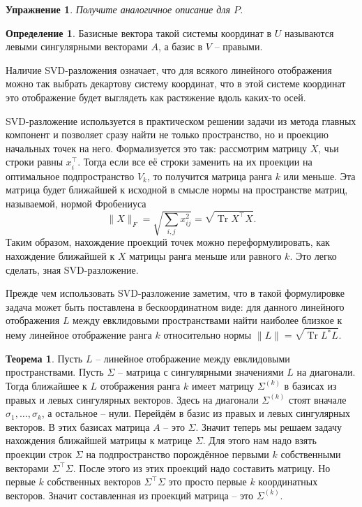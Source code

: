 \documentclass[10pt,a4paper,oneside]{book}
\newtheorem{uprz}{\color{violet!100!black} Упражнение}
\theoremstyle{definition}
\newtheorem*{defn}{\color{yellow!30!red} Определение}
\newtheorem{thm}{\color{red!40!black}Теорема}
\newcommand{\Tr}{\operatorname{Tr}}
\def\thrm{\begin{thm}}
\def\ethrm{\end{thm}}
\def\dfn{\begin{defn}}
\def\edfn{\end{defn}}
\def\upr{\begin{uprz}}
\def\eupr{\end{uprz}}
\begin{document}
\upr Получите аналогичное описание для $P$.
\eupr

\dfn Базисные вектора такой системы координат в $U$ называются левыми сингулярными векторами $A$, а базис в $V$ -- правыми.  
\edfn

Наличие SVD-разложения означает, что для всякого линейного отображения можно так выбрать декартову систему координат, что в этой системе координат это отображение будет выглядеть как растяжение вдоль каких-то осей.





SVD-разложение используется в практическом решении задачи из метода главных компонент и позволяет сразу найти не только пространство, но и проекцию начальных точек на него. Формализуется это так: рассмотрим матрицу $X$, чьи строки равны $x_i^{\top}$. Тогда если все её строки заменить на их проекции на оптимальное подпространство $V_k$, то получится матрица ранга $k$ или меньше. Эта матрица будет ближайшей к исходной в смысле нормы на пространстве матриц, называемой, нормой Фробениуса 
$$\|X\|_F=\sqrt{\sum_{i,j} x_{ij}^2}=\sqrt{\Tr X^{\top}X}.$$
Таким образом, нахождение проекций точек можно переформулировать, как нахождение ближайшей к $X$ матрицы ранга меньше или равного $k$. Это легко сделать, зная SVD-разложение.

Прежде чем использовать SVD-разложение заметим, что в такой формулировке задача может быть поставлена в бескоординатном виде: для данного линейного отображения $L$ между евклидовыми пространствами найти наиболее близкое к нему линейное отображение ранга $k$ относительно нормы $\|L\|=\sqrt{\Tr L^*L}$.

\thrm Пусть $L$ -- линейное отображение между евклидовыми пространствами. Пусть $\Sigma$ -- матрица с сингулярными значениями $L$ на диагонали. Тогда ближайшее к $L$ отображения ранга $k$ имеет матрицу $\Sigma^{(k)}$ в базисах из правых и левых сингулярных векторов. Здесь  на диагонали $\Sigma^{(k)}$ стоят вначале $\sigma_1,\dots,\sigma_{k}$, а остальное -- нули.
\proof Перейдём в базис из правых и левых сингулярных векторов. В этих базисах матрица $A$ -- это $\Sigma$.
Значит теперь мы решаем задачу нахождения ближайшей матрицы к матрице $\Sigma$. Для этого нам надо взять проекции строк $\Sigma$ на подпространство порождённое первыми $k$ собственными векторами $\Sigma^\top \Sigma$. После этого из этих проекций надо составить матрицу. Но первые $k$ собственных векторов $\Sigma^\top \Sigma$ это просто первые $k$ координатных векторов. Значит составленная из проекций матрица -- это $\Sigma^{(k)}$.
\endproof
\ethrm 
\end{document}
